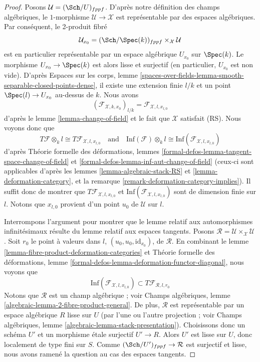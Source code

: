 \begin{proof}
Posons $\mathcal{U} = (\Sch/U)_{fppf}$. D'après notre définition des champs
algébriques, le $1$-morphisme $\mathcal{U} \to \mathcal{X}$ est représentable
par des espaces algébriques. Par conséquent, le 2-produit fibré
$$
\mathcal{U}_{x_0} = (\Sch/\Spec(k))_{fppf} \times_\mathcal{X} \mathcal{U}
$$
est en particulier représentable par un espace algébrique $U_{x_0}$ sur
$\Spec(k)$. Le morphisme $U_{x_0} \to \Spec(k)$ est alors lisse et surjectif
(en particulier, $U_{x_0}$ est non vide). D'après Espaces sur les corps, lemme
\ref{spaces-over-fields-lemma-smooth-separable-closed-points-dense}, il existe
une extension finie $l/k$ et un point $\Spec(l) \to U_{x_0}$ au-dessus de
$k$. Nous avons
$$
(\mathcal{F}_{\mathcal{X}, k , x_0})_{l/k} =
\mathcal{F}_{\mathcal{X}, l, x_{l, 0}}
$$
d'après le lemme \ref{lemma-change-of-field} et le fait que $\mathcal{X}$
satisfait (RS). Nous voyons donc que
$$
T\mathcal{F} \otimes_k l \cong T\mathcal{F}_{\mathcal{X}, l, x_{l, 0}}
\quad\text{and}\quad
\text{Inf}(\mathcal{F}) \otimes_k l \cong
\text{Inf}(\mathcal{F}_{\mathcal{X}, l, x_{l, 0}})
$$
d'après Théorie formelle des déformations, lemmes
\ref{formal-defos-lemma-tangent-space-change-of-field} et
\ref{formal-defos-lemma-inf-aut-change-of-field}
(ceux-ci sont applicables d'après les lemmes
\ref{lemma-algebraic-stack-RS} et \ref{lemma-deformation-category}, et la
remarque \ref{remark-deformation-category-implies}). Il suffit donc de montrer
que $T\mathcal{F}_{\mathcal{X}, l, x_{l, 0}}$ et
$\text{Inf}(\mathcal{F}_{\mathcal{X}, l, x_{l, 0}})$ sont de dimension finie
sur $l$. Notons que $x_{l, 0}$ provient d'un point $u_0$ de $\mathcal{U}$ sur
$l$.

\medskip\noindent
Interrompons l'argument pour montrer que le lemme relatif aux automorphismes
infinitésimaux résulte du lemme relatif aux espaces tangents. Posons
$\mathcal{R} = \mathcal{U} \times_\mathcal{X} \mathcal{U}$.
Soit $r_0$ le point à valeurs dans $l$, $(u_0, u_0, \text{id}_{x_0})$, de
$\mathcal{R}$. En combinant le lemme
\ref{lemma-fibre-product-deformation-categories} et Théorie formelle des
déformations, lemme \ref{formal-defos-lemma-deformation-functor-diagonal},
nous voyons que
$$
\text{Inf}(\mathcal{F}_{\mathcal{X}, l, x_{l, 0}})
\subset
T\mathcal{F}_{\mathcal{R}, l, r_0}
$$
Notons que $\mathcal{R}$ est un champ algébrique ; voir Champs algébriques,
lemme \ref{algebraic-lemma-2-fibre-product-general}. De plus, $\mathcal{R}$ est
représentable par un espace algébrique $R$ lisse sur $U$ (par l'une ou l'autre
projection ; voir Champs algébriques, lemme
\ref{algebraic-lemma-stack-presentation}). Choisissons donc un schéma $U'$ et
un morphisme étale surjectif $U' \to R$. Alors $U'$ est lisse sur $U$, donc
localement de type fini sur $S$. Comme $(\Sch/U')_{fppf} \to \mathcal{R}$ est
surjectif et lisse, nous avons ramené la question au cas des espaces tangents.


\end{proof}
